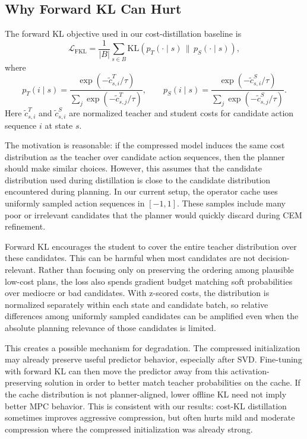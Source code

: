 \documentclass[11pt]{article}
\begin{document}
\subsection{Why Forward KL Can Hurt}
\label{sec:forward_kl_analysis}

The forward KL objective used in our cost-distillation baseline is
\[
    \mathcal{L}_{\mathrm{FKL}}
    =
    \frac{1}{|B|}
    \sum_{s \in B}
    \mathrm{KL}
    \left(
        p_T(\cdot \mid s)
        \,\|\, 
        p_S(\cdot \mid s)
    \right),
\]
where
\[
    p_T(i \mid s)
    =
    \frac{\exp(-\widetilde{c}^{T}_{s,i}/\tau)}
    {\sum_j \exp(-\widetilde{c}^{T}_{s,j}/\tau)},
    \qquad
    p_S(i \mid s)
    =
    \frac{\exp(-\widetilde{c}^{S}_{s,i}/\tau)}
    {\sum_j \exp(-\widetilde{c}^{S}_{s,j}/\tau)}.
\]
Here \(\widetilde{c}^{T}_{s,i}\) and \(\widetilde{c}^{S}_{s,i}\) are normalized teacher and student costs for candidate action sequence \(i\) at state \(s\).

The motivation is reasonable: if the compressed model induces the same cost distribution as the teacher over candidate action sequences, then the planner should make similar choices. However, this assumes that the candidate distribution used during distillation is close to the candidate distribution encountered during planning. In our current setup, the operator cache uses uniformly sampled action sequences in \([-1,1]\). These samples include many poor or irrelevant candidates that the planner would quickly discard during CEM refinement.

Forward KL encourages the student to cover the entire teacher distribution over these candidates. This can be harmful when most candidates are not decision-relevant. Rather than focusing only on preserving the ordering among plausible low-cost plans, the loss also spends gradient budget matching soft probabilities over mediocre or bad candidates. With z-scored costs, the distribution is normalized separately within each state and candidate batch, so relative differences among uniformly sampled candidates can be amplified even when the absolute planning relevance of those candidates is limited.

This creates a possible mechanism for degradation. The compressed initialization may already preserve useful predictor behavior, especially after SVD. Fine-tuning with forward KL can then move the predictor away from this activation-preserving solution in order to better match teacher probabilities on the cache. If the cache distribution is not planner-aligned, lower offline KL need not imply better MPC behavior. This is consistent with our results: cost-KL distillation sometimes improves aggressive compression, but often hurts mild and moderate compression where the compressed initialization was already strong.
\end{document}
